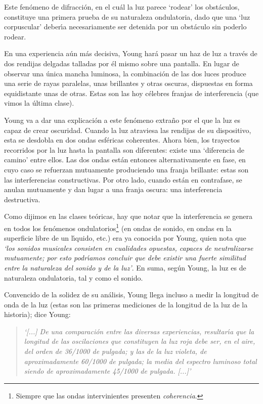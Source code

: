 \documentclass{article}
\begin{document}
Este fen\'omeno de difracci\'on, en el cu\'al la luz parece `rodear' los
obst\'aculos, constituye una primera prueba de su naturaleza ondulatoria, 
dado que una `luz corpuscular' deber\'\i a necesariamente ser detenida por
un obst\'aculo sin poderlo rodear. 

En una experiencia a\'un m\'as decisiva, Young har\'a pasar un haz de luz
a trav\'es de dos rendijas delgadas talladas por \'el mismo sobre una pantalla.
En lugar de observar una \'unica mancha luminosa, la combinaci\'on de las
dos luces produce una serie de rayas paralelas, unas brillantes y otras 
oscuras, dispuestas en forma equidistante unas de otras. Estas son las 
hoy c\'elebres franjas de interferencia (que vimos la \'ultima clase).

Young va a dar una explicaci\'on a este fen\'omeno extra\~no por el que la
luz es capaz de crear oscuridad. Cuando la luz atraviesa las rendijas de su
dispositivo, esta se desdobla en dos ondas esf\'ericas coherentes. Ahora bien,
los trayectos recorridos por la luz hasta la pantalla son diferentes: 
existe una `diferencia de camino' entre ellos. Las dos ondas est\'an entonces
alternativamente en fase, en cuyo caso se refuerzan mutuamente produciendo
una franja brillante: estas son las interferencias constructivas. Por otro 
lado, cuando est\'an en contrafase, se anulan mutuamente y dan lugar a 
una franja oscura: una interferencia destructiva.

Como dijimos en las clases te\'oricas, hay que notar que la interferencia se
genera en todos los fen\'omenos ondulatorios\footnote{
Siempre que las ondas 
intervinientes presenten {\it coherencia}. 
} 
(en ondas de sonido, en ondas
en la superficie libre de un l\'\i quido, etc.) era ya conocida por Young, 
quien nota que {\it `los sonidos
musicales consisten en cualidades opuestas, capaces de neutralizarse 
mutuamente; por esto podr\'\i amos concluir que debe existir una fuerte
similitud entre la naturaleza del sonido y de la luz'}. En suma, seg\'un
Young, la luz es de naturaleza ondulatoria, tal y como el sonido.

Convencido de la solidez de su an\'alisis, Young llega incluso a medir 
la longitud de onda de la luz (estas son las primeras mediciones de la
longitud de la luz de la historia); dice Young: 

\begin{quote}
    {\it 
        `[...] De una comparaci\'on 
entre las diversas experiencias, resultar\'\i a que la longitud de las
oscilaciones que constituyen la luz roja debe ser, en el aire, del 
orden de 36/1000 de pulgada; y las de la luz violeta, de aproximadamente
60/1000 de pulgada; la media del espectro luminoso total siendo de
aproximadamente 45/1000 de pulgada. [...]' 
}
\end{quote}
\end{document}
